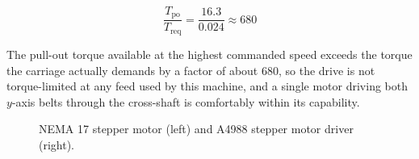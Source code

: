 \begin{equation}
\frac{T_{\mathrm{po}}}{T_{\mathrm{req}}} = \frac{16.3}{0.024} \approx 680
\label{eq:gan-margin-eq}
\end{equation}

The pull-out torque available at the highest commanded speed exceeds the torque the carriage actually demands by a factor of about 680, so the drive is not torque-limited at any feed used by this machine, and a single motor driving both $y$-axis belts through the cross-shaft is comfortably within its capability.

\begin{figure}[!htbp]
    \centering
    \begin{minipage}[c]{0.48\linewidth}
        \centering
    \end{minipage}\hfill
    \begin{minipage}[c]{0.48\linewidth}
        \centering
    \end{minipage}
    \caption{NEMA 17 stepper motor (left) and A4988 stepper motor driver (right).}
    \label{fig:stepper-motor-and-driver}
\end{figure}

